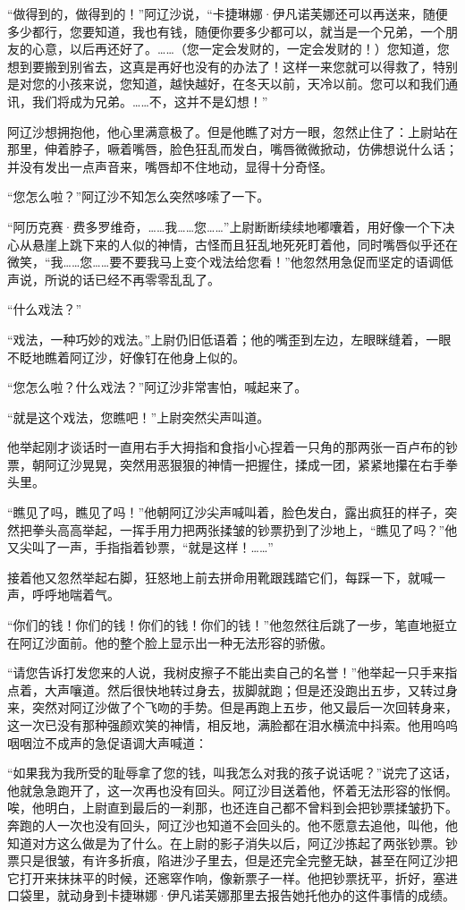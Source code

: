 \par “做得到的，做得到的！”阿辽沙说，“卡捷琳娜·伊凡诺芙娜还可以再送来，随便多少都行，您要知道，我也有钱，随便你要多少都可以，就当是一个兄弟，一个朋友的心意，以后再还好了。……（您一定会发财的，一定会发财的！）您知道，您想到要搬到别省去，这真是再好也没有的办法了！这样一来您就可以得救了，特别是对您的小孩来说，您知道，越快越好，在冬天以前，天冷以前。您可以和我们通讯，我们将成为兄弟。……不，这并不是幻想！”
\par 阿辽沙想拥抱他，他心里满意极了。但是他瞧了对方一眼，忽然止住了：上尉站在那里，伸着脖子，噘着嘴唇，脸色狂乱而发白，嘴唇微微掀动，仿佛想说什么话；并没有发出一点声音来，嘴唇却不住地动，显得十分奇怪。
\par “您怎么啦？”阿辽沙不知怎么突然哆嗦了一下。
\par “阿历克赛·费多罗维奇，……我……您……”上尉断断续续地嘟囔着，用好像一个下决心从悬崖上跳下来的人似的神情，古怪而且狂乱地死死盯着他，同时嘴唇似乎还在微笑，“我……您……要不要我马上变个戏法给您看！”他忽然用急促而坚定的语调低声说，所说的话已经不再零零乱乱了。
\par “什么戏法？”
\par “戏法，一种巧妙的戏法。”上尉仍旧低语着；他的嘴歪到左边，左眼眯缝着，一眼不眨地瞧着阿辽沙，好像钉在他身上似的。
\par “您怎么啦？什么戏法？”阿辽沙非常害怕，喊起来了。
\par “就是这个戏法，您瞧吧！”上尉突然尖声叫道。
\par 他举起刚才谈话时一直用右手大拇指和食指小心捏着一只角的那两张一百卢布的钞票，朝阿辽沙晃晃，突然用恶狠狠的神情一把握住，揉成一团，紧紧地攥在右手拳头里。
\par “瞧见了吗，瞧见了吗！”他朝阿辽沙尖声喊叫着，脸色发白，露出疯狂的样子，突然把拳头高高举起，一挥手用力把两张揉皱的钞票扔到了沙地上，“瞧见了吗？”他又尖叫了一声，手指指着钞票，“就是这样！……”
\par 接着他又忽然举起右脚，狂怒地上前去拼命用靴跟践踏它们，每踩一下，就喊一声，呼呼地喘着气。
\par “你们的钱！你们的钱！你们的钱！你们的钱！”他忽然往后跳了一步，笔直地挺立在阿辽沙面前。他的整个脸上显示出一种无法形容的骄傲。
\par “请您告诉打发您来的人说，我树皮擦子不能出卖自己的名誉！”他举起一只手来指点着，大声嚷道。然后很快地转过身去，拔脚就跑；但是还没跑出五步，又转过身来，突然对阿辽沙做了个飞吻的手势。但是再跑上五步，他又最后一次回转身来，这一次已没有那种强颜欢笑的神情，相反地，满脸都在泪水横流中抖索。他用呜呜咽咽泣不成声的急促语调大声喊道：
\par “如果我为我所受的耻辱拿了您的钱，叫我怎么对我的孩子说话呢？”说完了这话，他就急急跑开了，这一次再也没有回头。阿辽沙目送着他，怀着无法形容的怅惘。唉，他明白，上尉直到最后的一刹那，也还连自己都不曾料到会把钞票揉皱扔下。奔跑的人一次也没有回头，阿辽沙也知道不会回头的。他不愿意去追他，叫他，他知道对方这么做是为了什么。在上尉的影子消失以后，阿辽沙拣起了两张钞票。钞票只是很皱，有许多折痕，陷进沙子里去，但是还完全完整无缺，甚至在阿辽沙把它打开来抹抹平的时候，还窸窣作响，像新票子一样。他把钞票抚平，折好，塞进口袋里，就动身到卡捷琳娜·伊凡诺芙娜那里去报告她托他办的这件事情的成绩。




